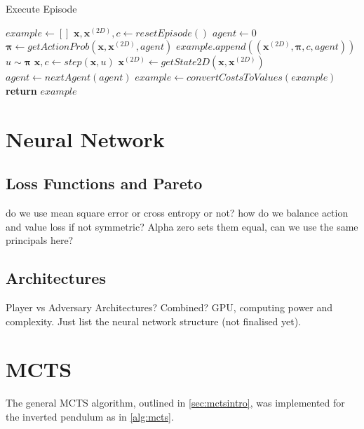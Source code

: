 \documentclass[../main.tex]{subfiles}
\begin{document}
\begin{algorithm}
   \caption{Execute Episode}
   \label{alg:executeEpisode}
   \begin{algorithmic}[1]
      \State $example \leftarrow []$
      \State $\boldsymbol{x}, \boldsymbol{x}^{(2D)}, c \leftarrow resetEpisode()$
      \State $agent\leftarrow 0$
      \Repeat
         \State $\boldsymbol{\pi} \leftarrow getActionProb(\boldsymbol{x}, \boldsymbol{x}^{(2D)}, agent)$
         \State $example.append((\boldsymbol{x}^{(2D)}, \boldsymbol{\pi}, c, agent))$
         \State $u \sim \boldsymbol{\pi}$
         \State $\boldsymbol{x}, c \leftarrow step(\boldsymbol{x}, u)$
         \State $\boldsymbol{x}^{(2D)} \leftarrow getState2D(\boldsymbol{x}, \boldsymbol{x}^{(2D)})$
         \State $agent \leftarrow nextAgent(agent)$
      \State $example \leftarrow convertCostsToValues(example)$
      \State \textbf{return} $example$
      \EndFunction
   \end{algorithmic}
\end{algorithm}

\section{Neural Network}
\subsection{Loss Functions and Pareto}
do we use mean square error or cross entropy or not? how do we balance action and value loss if not symmetric? Alpha zero sets them equal, can we use the same principals here?

\subsection{Architectures}
Player vs Adversary Architectures? Combined? GPU, computing power and complexity. Just list the neural network structure (not finalised yet).

\section{MCTS}

The general MCTS algorithm, outlined in \cref{sec:mctsintro}, was implemented for the inverted pendulum as in \cref{alg:mcts}.
\end{document}
